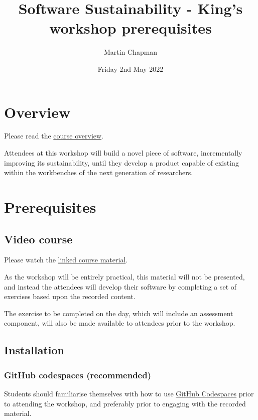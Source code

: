 \documentclass{article}
\title{Software Sustainability - King's workshop prerequisites}
\author{Martin Chapman}
\date{Friday 2nd May 2022}
\begin{document}

\maketitle

\section{Overview}

Please read the \href{https://github.com/martinteaching/sustainability#overview}{course overview}.

Attendees at this workshop will build a novel piece of software, incrementally improving its sustainability, until they develop a product capable of existing within the workbenches of the next generation of researchers.

\section{Prerequisites}

\subsection{Video course}

Please watch the \href{https://github.com/martinteaching/sustainability#material}{linked course material}.

As the workshop will be entirely practical, this material will not be presented, and instead the attendees will develop their software by completing a set of exercises based upon the recorded content. 

The exercise to be completed on the day, which will include an assessment component, will also be made available to attendees prior to the workshop.

\subsection{Installation}

\subsubsection{GitHub codespaces (recommended)}

Students should familiarise themselves with how to use \href{https://github.com/codespaces}{GitHub Codespaces} prior to attending the workshop, and preferably prior to engaging with the recorded material.
\end{document}
